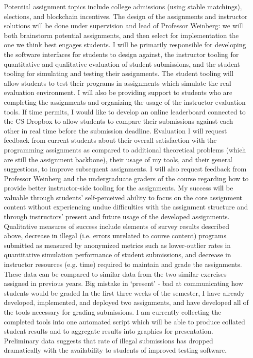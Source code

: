 \documentclass[pageno]{jpaper}
\begin{document}
    Potential assignment topics include college admissions (using stable matchings), elections, and blockchain incentives. The design of the assignments and instructor solutions will be done under supervision and lead of Professor Weinberg: we will both brainstorm potential assignments, and then select for implementation the one we think best engages students. I will be primarily responsible for developing the software interfaces for students to design against, the instructor tooling for quantitative and qualitative evaluation of student submissions, and the student tooling for simulating and testing their assignments. The student tooling will allow students to test their programs in assignments which simulate the real evaluation environment. I will also be providing support to students who are completing the assignments and organizing the usage of the instructor evaluation tools. If time permits, I would like to develop an online leaderboard connected to the CS Dropbox to allow students to compare their submissions against each other in real time before the submission deadline.
Evaluation
I will request feedback from current students about their overall satisfaction with the programming assignments as compared to additional theoretical problems (which are still the assignment backbone), their usage of my tools, and their general suggestions, to improve subsequent assignments. I will also request feedback from Professor Weinberg and the undergraduate graders of the course regarding how to provide better instructor-side tooling for the assignments. My success will be valuable through students’ self-perceived ability to focus on the core assignment content without experiencing undue difficulties with the assignment structure and through instructors’ present and future usage of the developed  assignments. Qualitative measures of success include elements of survey results described above, decrease in illegal (i.e. errors unrelated to course content) programs submitted as measured by anonymized metrics such as lower-outlier rates in quantitative simulation performance of student submissions, and decrease in instructor resources (e.g. time) required to maintain and grade the assignments. These data can be compared to similar data from the two similar exercises assigned in previous years.
Big mistake in ‘present’ - bad at communicating how students would be graded
In the first three weeks of the semester, I have already developed, implemented, and deployed two assignments, and have developed all of the tools necessary for grading submissions. I am currently collecting the completed tools into one automated script which will be able to produce collated student results and to aggregate results into graphics for presentation. Preliminary data suggests that rate of illegal submissions has dropped dramatically with the availability to students of improved testing software.
\end{document}
